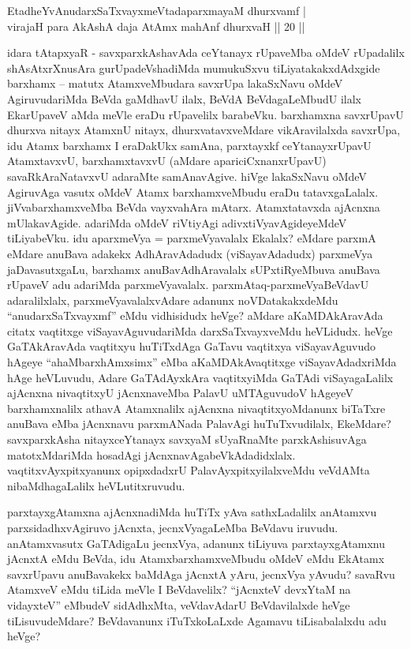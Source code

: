 \begin{shl}
EtadheYvAnudarxSaTxvayxmeVtadaparxmayaM dhurxvamf |\\
virajaH para AkAshA daja AtAmx mahAnf dhurxvaH || 20 ||
\end{shl}

\begin{artha}
idara tAtapxyaR - savxparxkAshavAda ceYtanayx rUpaveMba oMdeV rUpadalilx shAsAtxrXnusAra gurUpadeVshadiMda mumukuSxvu tiLiyatakakxdAdxgide barxhamx -- matutx AtamxveMbudara savxrUpa lakaSxNavu oMdeV AgiruvudariMda BeVda gaMdhavU ilalx, BeVdA BeVdagaLeMbudU ilalx EkarUpaveV aMda meVle eraDu rUpavelilx barabeVku. barxhamxna savxrUpavU dhurxva nitayx AtamxnU nitayx, dhurxvatavxveMdare vikAravilalxda savxrUpa, idu Atamx barxhamx I eraDakUkx samAna, parxtayxkf ceYtanayxrUpavU AtamxtavxvU, barxhamxtavxvU (aMdare apariciCxnanxrUpavU) savaRkAraNatavxvU adaraMte samAnavAgive. hiVge lakaSxNavu oMdeV AgiruvAga vasutx oMdeV Atamx barxhamxveMbudu eraDu tatavxgaLalalx. jiVvabarxhamxveMba BeVda vayxvahAra mAtarx. Atamxtatavxda ajAcnxna mUlakavAgide. adariMda oMdeV riVtiyAgi adivxtiVyavAgideyeMdeV tiLiyabeVku. idu aparxmeVya = parxmeVyavalalx Ekalalx? eMdare parxmA eMdare anuBava adakekx AdhAravAdadudx (viSayavAdadudx) parxmeVya jaDavasutxgaLu, barxhamx anuBavAdhAravalalx sUPxtiRyeMbuva anuBava rUpaveV adu adariMda parxmeVyavalalx. parxmAtaq-parxmeVyaBeVdavU adaralilxlalx, parxmeVyavalalxvAdare adanunx noVDatakakxdeMdu ``anudarxSaTxvayxmf'' eMdu vidhisidudx heVge? aMdare aKaMDAkAravAda citatx vaqtitxge viSayavAguvudariMda darxSaTxvayxveMdu heVLidudx. heVge GaTAkAravAda vaqtitxyu huTiTxdAga GaTavu vaqtitxya viSayavAguvudo hAgeye ``ahaMbarxhAmxsimx'' eMba aKaMDAkAvaqtitxge viSayavAdadxriMda hAge heVLuvudu, Adare GaTAdAyxkAra vaqtitxyiMda GaTAdi viSayagaLalilx ajAcnxna nivaqtitxyU jAcnxnaveMba PalavU uMTAguvudoV hAgeyeV barxhamxnalilx athavA Atamxnalilx ajAcnxna nivaqtitxyoMdanunx biTaTxre anuBava eMba jAcnxnavu parxmANada PalavAgi huTuTxvudilalx, EkeMdare? savxparxkAsha nitayxceYtanayx savxyaM sUyaRnaMte parxkAshisuvAga matotxMdariMda hosadAgi jAcnxnavAgabeVkAdadidxlalx. vaqtitxvAyxpitxyanunx opipxdadxrU PalavAyxpitxyilalxveMdu veVdAMta nibaMdhagaLalilx heVLutitxruvudu.

parxtayxgAtamxna ajAcnxnadiMda huTiTx yAva sathxLadalilx anAtamxvu parxsidadhxvAgiruvo jAcnxta, jecnxVyagaLeMba BeVdavu iruvudu. anAtamxvasutx GaTAdigaLu jecnxVya, adanunx tiLiyuva parxtayxgAtamxnu jAcnxtA eMdu BeVda, idu AtamxbarxhamxveMbudu oMdeV eMdu EkAtamx savxrUpavu anuBavakekx baMdAga jAcnxtA yAru, jecnxVya yAvudu?  savaRvu AtamxveV eMdu tiLida meVle I BeVdavelilx? ``jAcnxteV devxYtaM na vidayxteV'' eMbudeV sidAdhxMta, veVdavAdarU BeVdavilalxde heVge tiLisuvudeMdare? BeVdavanunx iTuTxkoLaLxde Agamavu tiLisabalalxdu adu heVge? 
\end{artha}

